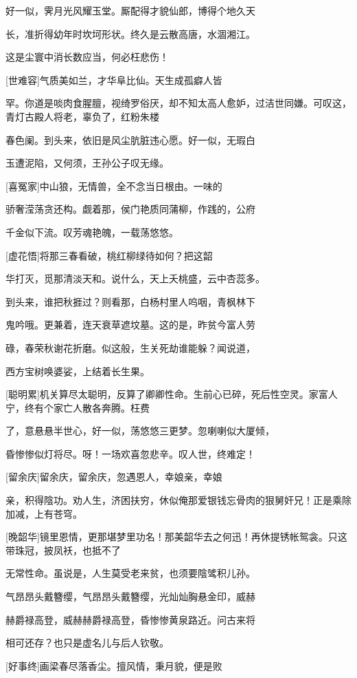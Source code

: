 好一似，霁月光风耀玉堂。厮配得才貌仙郎，博得个地久天

长，准折得幼年时坎坷形状。终久是云散高唐，水涸湘江。

这是尘寰中消长数应当，何必枉悲伤！

[世难容]气质美如兰，才华阜比仙。天生成孤癖人皆

罕。你道是啖肉食腥膻，视绮罗俗厌，却不知太高人愈妒，过洁世同嫌。可叹这，青灯古殿人将老，辜负了，红粉朱楼

春色阑。到头来，依旧是风尘肮脏违心愿。好一似，无瑕白

玉遭泥陷，又何须，王孙公子叹无缘。

[喜冤家]中山狼，无情兽，全不念当日根由。一味的

骄奢滢荡贪还构。觑着那，侯门艳质同蒲柳，作践的，公府

千金似下流。叹芳魂艳魄，一载荡悠悠。

[虚花悟]将那三春看破，桃红柳绿待如何？把这韶

华打灭，觅那清淡天和。说什么，天上夭桃盛，云中杏蕊多。

到头来，谁把秋捱过？则看那，白杨村里人呜咽，青枫林下

鬼吟哦。更兼着，连天衰草遮坟墓。这的是，昨贫今富人劳

碌，春荣秋谢花折磨。似这般，生关死劫谁能躲？闻说道，

西方宝树唤婆娑，上结着长生果。

[聪明累]机关算尽太聪明，反算了卿卿性命。生前心已碎，死后性空灵。家富人宁，终有个家亡人散各奔腾。枉费

了，意悬悬半世心，好一似，荡悠悠三更梦。忽喇喇似大厦倾，

昏惨惨似灯将尽。呀！一场欢喜忽悲辛。叹人世，终难定！

[留余庆]留余庆，留余庆，忽遇恩人，幸娘亲，幸娘

亲，积得陰功。劝人生，济困扶穷，休似俺那爱银钱忘骨肉的狠舅奸兄！正是乘除加减，上有苍穹。

[晚韶华]镜里恩情，更那堪梦里功名！那美韶华去之何迅！再休提锈帐鸳衾。只这带珠冠，披凤袄，也抵不了

无常性命。虽说是，人生莫受老来贫，也须要陰骘积儿孙。

气昂昂头戴簪缨，气昂昂头戴簪缨，光灿灿胸悬金印，威赫

赫爵禄高登，威赫赫爵禄高登，昏惨惨黄泉路近。问古来将

相可还存？也只是虚名儿与后人钦敬。

[好事终]画梁春尽落香尘。擅风情，秉月貌，便是败

